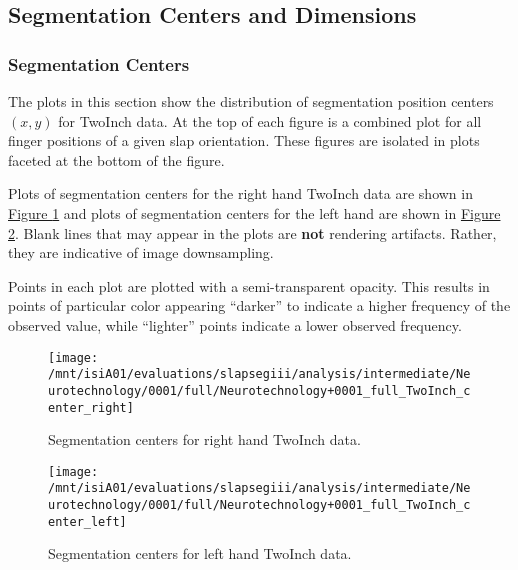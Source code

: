 \documentclass[]{article}
\begin{document}
\clearpage

\subsection{Segmentation Centers and
Dimensions}\label{segmentation-centers-and-dimensions}

\subsubsection{Segmentation Centers}\label{segmentation-centers}

The plots in this section show the distribution of segmentation position
centers \((x,y)\) for TwoInch data. At the top of each figure is a
combined plot for all finger positions of a given slap orientation.
These figures are isolated in plots faceted at the bottom of the figure.

Plots of segmentation centers for the right hand TwoInch data are shown
in \protect\hyperlink{fig:twoinch-centers-right}{Figure
\ref{fig:twoinch-centers-right}} and plots of segmentation centers for
the left hand are shown in
\protect\hyperlink{fig:twoinch-centers-left}{Figure
\ref{fig:twoinch-centers-left}}. Blank lines that may appear in the
plots are \textbf{not} rendering artifacts. Rather, they are indicative
of image downsampling.

Points in each plot are plotted with a semi-transparent opacity. This
results in points of particular color appearing ``darker'' to indicate a
higher frequency of the observed value, while ``lighter'' points
indicate a lower observed frequency.

\begin{figure}

{\centering \texttt{[image: /mnt/isiA01/evaluations/slapsegiii/analysis/intermediate/Neurotechnology/0001/full/Neurotechnology+0001\_full\_TwoInch\_center\_right]} 

}

\caption{Segmentation centers for right hand TwoInch data.}\label{fig:twoinch-centers-right}
\end{figure}

\begin{figure}

{\centering \texttt{[image: /mnt/isiA01/evaluations/slapsegiii/analysis/intermediate/Neurotechnology/0001/full/Neurotechnology+0001\_full\_TwoInch\_center\_left]} 

}

\caption{Segmentation centers for left hand TwoInch data.}\label{fig:twoinch-centers-left}
\end{figure}
\end{document}
